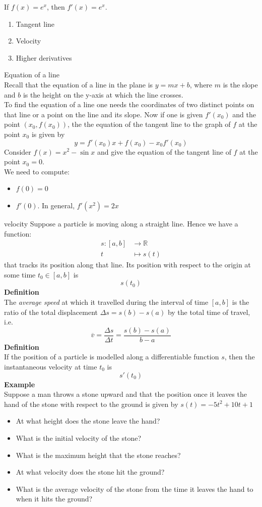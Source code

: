 \documentclass[]{article}
\begin{document}
	If $f(x)=e^x$, then $f'(x)=e^x$.
	\begin{enumerate}
		\item Tangent line
		\item Velocity
		\item Higher derivatives
	\end{enumerate}
	\large{Equation of a line}\\
	\normalsize
	Recall that the equation of a line in the plane is $y=mx+b$, where $m$ is the slope and $b$ is the height on the y-axis at which the line crosses.\\
	To find the equation of a line one needs the coordinates of two distinct points on that line or a point on the line and its slope. Now if one is given $f'(x_0)$ and the point $(x_0,f(x_0))$, the the equation of the tangent line to the graph of $f$ at the point $x_0$ is given by
	$$
		y=f'(x_0)x+f(x_0)-x_0f'(x_0)
	$$%
	Consider $f(x)=x^2-\sin x$ and give the equation of the tangent line of $f$ at the point $x_0=0$.\\
	We need to compute:
	\begin{itemize}
		\item $f(0)=0$
		\item $f'(0)$. In general, $f'(x^2)=2x$
	\end{itemize}
	\large{velocity}
	Suppose a particle is moving along a straight line. Hence we have a function:
	\begin{align*}
		s:[a,b]&\rightarrow\mathbb{R}\\
		t&\mapsto s(t)
	\end{align*}
	that tracks its position along that line. Its position with respect to the origin at some time $t_0\in[a,b]$ is
	$$
		s(t_0)
	$$
	{\bf Definition}\\
	The \emph{average speed} at which it travelled during the interval of time $[a,b]$ is the ratio of the total displacement $\Delta s=s(b)-s(a)$ by the total time of travel, i.e.
	$$
		\overline{v}=\frac{\Delta s}{\Delta t}=\frac{s(b)-s(a)}{b-a}
	$$
	{\bf Definition}\\
	If the position of a particle is modelled along a differentiable function $s$, then the instantaneous velocity at time $t_0$ is
	$$
		s'(t_0)
	$$
	{\bf Example}\\
	Suppose a man throws a stone upward and that the position once it leaves the hand of the stone with respect to the ground is given by $s(t)=-5t^2+10t+1$
	\begin{itemize}
		\item At what height does the stone leave the hand?
		\item What is the initial velocity of the stone?
		\item What is the maximum height that the stone reaches?
		\item At what velocity does the stone hit the ground?
		\item What is the average velocity of the stone from the time it leaves the hand to when it hits the ground?
	\end{itemize}
\end{document}
